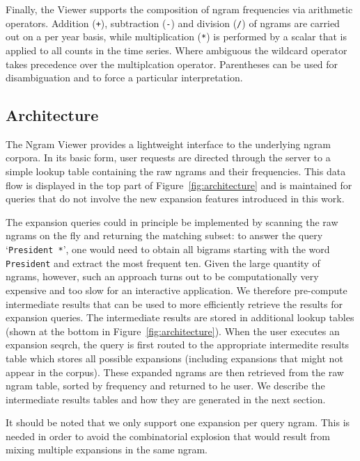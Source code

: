 \documentclass[11pt,a4paper]{article}
\newcommand{\query}[1]{\texttt{#1}}
\begin{document}
Finally, the Viewer supports the composition of ngram frequencies via arithmetic operators. Addition (\query{+}), subtraction (\query{-}) and division (\query{/}) of ngrams are carried out on a per year basis, while multiplication (\query{*}) is performed by a scalar that is applied to all counts in the time series. Where ambiguous the wildcard operator takes precedence over the multiplcation operator. Parentheses can be used for disambiguation and to force a particular interpretation.

\subsection{Architecture}
The Ngram Viewer provides a lightweight interface to the underlying ngram corpora. In its basic form, user requests are directed through the server to a simple lookup table containing the raw ngrams and their frequencies. This data flow is displayed in the top part of Figure~\ref{fig:architecture} and is maintained for queries that do not involve the new expansion features introduced in this work.

The expansion queries could in principle be implemented by scanning the raw ngrams on the fly and returning the matching subset: to answer the query `\query{President *}', one would need to obtain all bigrams starting with the word \query{President} and extract the most frequent ten. Given the large quantity of ngrams, however, such an approach turns out to be computationally very expensive and too slow for an interactive application. We therefore pre-compute intermediate results that can be used to more efficiently retrieve the results for expansion queries. The intermediate results are stored in additional lookup tables (shown at the bottom in Figure~\ref{fig:architecture}). When the user executes an expansion seqrch, the query is first routed to the appropriate intermedite results table which stores all possible expansions (including expansions that might not appear in the corpus).  These expanded ngrams are then retrieved from the raw ngram table, sorted by frequency and returned to he user.
We describe the intermediate results tables and how they are generated in the next section.

It should be noted that we only support one expansion per query ngram. This is needed in order to avoid the combinatorial explosion that would result from mixing multiple expansions in the same ngram.
\end{document}

